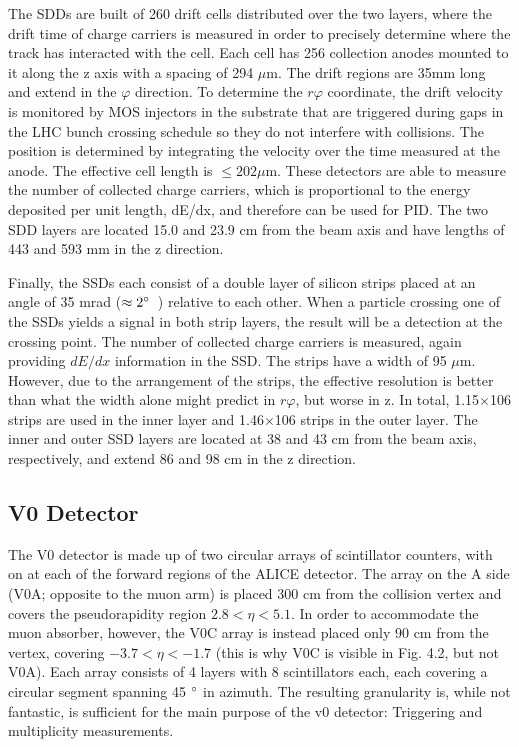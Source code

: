 The SDDs are built of 260 drift cells distributed over the two layers, where the drift time of charge carriers is measured in order to precisely determine where the track has interacted with the cell. Each cell has 256 collection anodes mounted to it along the z axis with a spacing of 294 $\mu$m. The drift regions are 35mm long and extend in the $\varphi$ direction. To determine the $r\varphi$ coordinate, the drift velocity is monitored by MOS injectors in the substrate that are triggered during gaps in the LHC bunch crossing schedule so they do not interfere with collisions. The position is determined by integrating the velocity over the time measured at the anode. The effective cell length is $\leq 202\mu$m. These detectors are able to measure the number of collected charge carriers, which is proportional to the energy deposited per unit length, dE/dx, and therefore can be used for PID. The two SDD layers are located 15.0 and 23.9 cm from the beam axis and have lengths of 443 and 593 mm in the z direction.

Finally, the SSDs each consist of a double layer of silicon strips placed at an angle of 35 mrad ($\approx 2\degree$~) relative to each other. When a particle crossing one of the SSDs yields a signal in both strip layers, the result will be a detection at the crossing point. The number of collected charge carriers is measured, again providing $dE/dx$ information in the SSD. The strips have a width of 95 $\mu$m. However, due to the arrangement of the strips, the effective resolution is better than what the width alone might predict in $r\varphi$, but worse in z. In total, 1.15$\times$106 strips are used in the inner layer and 1.46$\times$106 strips in the outer layer. The inner and outer SSD layers are located at 38 and 43 cm from the beam axis, respectively, and extend 86 and 98 cm in the z direction.


\subsection{V0 Detector}
The V0 detector is made up of two circular arrays of scintillator counters, with on at each of the forward regions of the ALICE detector. The array on the A side (V0A; opposite to the muon arm) is placed 300 cm from the collision vertex and covers the pseudorapidity region $2.8 < \eta < 5.1$. In order to accommodate the muon absorber, however, the V0C array is instead placed only 90 cm from the vertex, covering $-3.7 < \eta < -1.7$ (this is why V0C is visible in Fig. 4.2, but not V0A). Each array consists of 4 layers with 8 scintillators each, each covering a circular segment spanning 45 $\degree$ in azimuth. The resulting granularity is, while not fantastic, is sufficient for the main purpose of the v0 detector: Triggering and multiplicity measurements.

